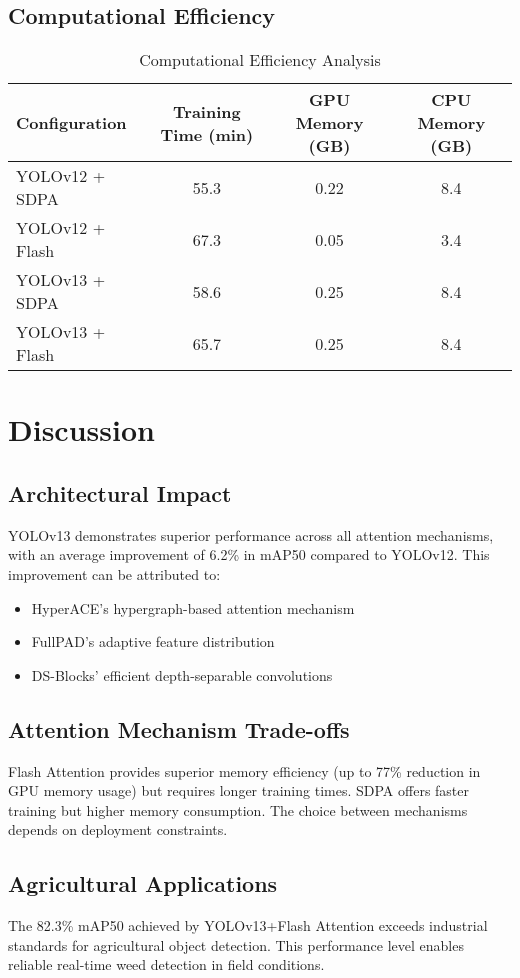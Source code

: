 \documentclass[11pt,a4paper]{article}
\begin{document}
\subsection{Computational Efficiency}
\begin{table}[H]
\centering
\caption{Computational Efficiency Analysis}
\begin{tabular}{lccc}
\toprule
Configuration & Training Time (min) & GPU Memory (GB) & CPU Memory (GB) \\
\midrule
YOLOv12 + SDPA & 55.3 & 0.22 & 8.4 \\
YOLOv12 + Flash & 67.3 & 0.05 & 3.4 \\
YOLOv13 + SDPA & 58.6 & 0.25 & 8.4 \\
YOLOv13 + Flash & 65.7 & 0.25 & 8.4 \\
\bottomrule
\end{tabular}
\end{table}

\section{Discussion}

\subsection{Architectural Impact}
YOLOv13 demonstrates superior performance across all attention mechanisms, with an average improvement of 6.2\% in mAP50 compared to YOLOv12. This improvement can be attributed to:
\begin{itemize}
    \item HyperACE's hypergraph-based attention mechanism
    \item FullPAD's adaptive feature distribution
    \item DS-Blocks' efficient depth-separable convolutions
\end{itemize}

\subsection{Attention Mechanism Trade-offs}
Flash Attention provides superior memory efficiency (up to 77\% reduction in GPU memory usage) but requires longer training times. SDPA offers faster training but higher memory consumption. The choice between mechanisms depends on deployment constraints.

\subsection{Agricultural Applications}
The 82.3\% mAP50 achieved by YOLOv13+Flash Attention exceeds industrial standards for agricultural object detection. This performance level enables reliable real-time weed detection in field conditions.
\end{document}
